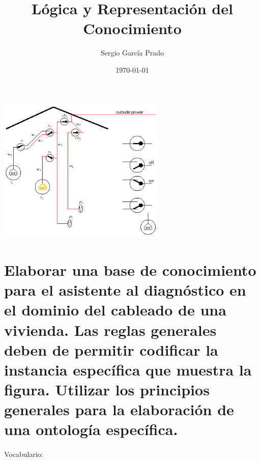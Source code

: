 \documentclass[10pt, a4paper,spanish]{article}
\title{\vspace{-15mm}\fontsize{24pt}{10pt}\selectfont\textbf{Lógica y Representación del Conocimiento}} %
\author{Sergio García Prado}
\date{\today}
\begin{document}
	\maketitle %

	\thispagestyle{fancy} %


	\begin{center}
		\includegraphics[width=0.6\textwidth]{diagnostic-assistant}
	\end{center}

	\section{Elaborar una base de conocimiento para el asistente al diagnóstico en el dominio del cableado de una vivienda. Las reglas generales deben de permitir codificar la instancia específica que muestra la figura. Utilizar los principios generales para la elaboración de una ontología específica.}


		\paragraph{}
		Vocabulario: \\
\end{document}
